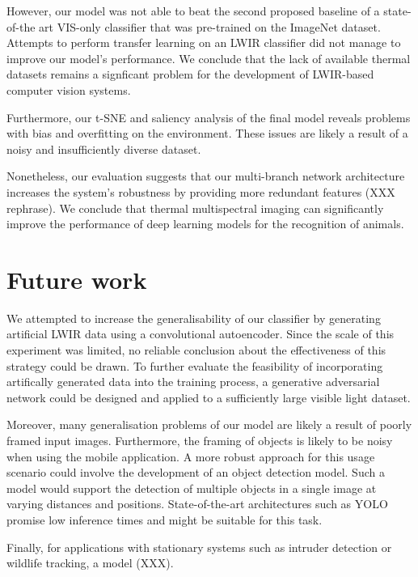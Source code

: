 \documentclass{l4proj}
\begin{document}
However, our model was not able to beat the second proposed baseline of a state-of-the art VIS-only classifier that was pre-trained on the ImageNet dataset. Attempts to perform transfer learning on an LWIR classifier did not manage to improve our model's performance. We conclude that the lack of available thermal datasets remains a signficant problem for the development of LWIR-based computer vision systems.

Furthermore, our t-SNE and saliency analysis of the final model reveals problems with bias and overfitting on the environment. These issues are likely a result of a noisy and insufficiently diverse dataset.

Nonetheless, our evaluation suggests that our multi-branch network architecture increases the system's robustness by providing more redundant features (XXX rephrase). We conclude that thermal multispectral imaging can significantly improve the performance of deep learning models for the recognition of animals.


\section{Future work}

We attempted to increase the generalisability of our classifier by generating artificial LWIR data using a convolutional autoencoder. Since the scale of this experiment was limited, no reliable conclusion about the effectiveness of this strategy could be drawn. To further evaluate the feasibility of incorporating artifically generated data into the training process, a generative adversarial network could be designed and applied to a sufficiently large visible light dataset.

Moreover, many generalisation problems of our model are likely a result of poorly framed input images. Furthermore, the framing of objects is likely to be noisy when using the mobile application. A more robust approach for this usage scenario could involve the development of an object detection model. Such a model would support the detection of multiple objects in a single image at varying distances and positions. State-of-the-art architectures such as YOLO \citep{redmon_you_2016, redmon_yolov3_2018} promise low inference times and might be suitable for this task. 

Finally, for applications with stationary systems such as intruder detection or wildlife tracking, a model (XXX).
\end{document}
